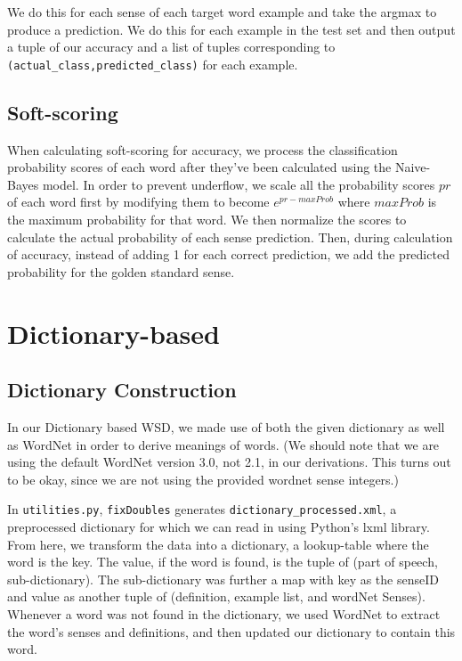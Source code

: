 \documentclass{article}
\begin{document}
We do this for each sense of each target word example and take the argmax to produce a prediction. We do this for each example in the test set and then output a tuple of our accuracy and a list of tuples corresponding to \texttt{(actual\_class,predicted\_class)} for each example. 

\subsection{Soft-scoring}
When calculating soft-scoring for accuracy, we process the classification probability scores of each word after they've been calculated using the Naive-Bayes model. In order to prevent underflow, we scale all the probability scores $pr$ of each word first by modifying them to become $e^{pr-maxProb}$ where $maxProb$ is the maximum probability for that word. We then normalize the scores to calculate the actual probability of each sense prediction. Then, during calculation of accuracy, instead of adding 1 for each correct prediction, we add the predicted probability for the golden standard sense.


\section{Dictionary-based}

\subsection{Dictionary Construction}
In our Dictionary based WSD, we made use of both the given dictionary as well as WordNet in order to derive meanings of words. (We should note that we are using the default WordNet version 3.0, not 2.1, in our derivations. This turns out to be okay, since we are not using the provided wordnet sense integers.)

In \texttt{utilities.py}, \texttt{fixDoubles} generates \texttt{dictionary\_processed.xml}, a preprocessed dictionary for which we can read in using Python's lxml library. From here, we transform the data into a dictionary, a lookup-table where the word is the key. The value, if the word is found, is the tuple of (part of speech, sub-dictionary). The sub-dictionary was further a map with key as the senseID and value as another tuple of (definition, example list, and wordNet Senses). Whenever a word was not found in the dictionary, we used WordNet to extract the word's senses and definitions, and then updated our dictionary to contain this word.
\end{document}
